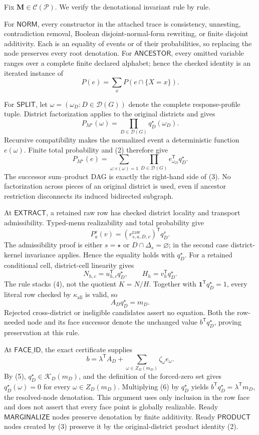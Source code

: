 Fix \(\mathbf M\in\mathcal C(\mathcal P)\).  We verify the denotational invariant rule by rule.

For \(\mathsf{NORM}\), every constructor in the attached trace is consistency, unnesting, contradiction removal, Boolean disjoint-normal-form rewriting, or finite disjoint additivity.  Each is an equality of events or of their probabilities, so replacing the node preserves every root denotation.  For \(\mathsf{ANCESTOR}\), every omitted variable ranges over a complete finite declared alphabet; hence the checked identity is an iterated instance of
\[
P(e)=\sum_xP(e\cap\{X=x\}).
\tag{1}
\]

For \(\mathsf{SPLIT}\), let \(\omega=(\omega_D:D\in\mathcal D(G))\) denote the complete response-profile tuple.  District factorization applies to the original districts and gives
\[
P_{M^\star}(\omega)=
\prod_{D\in\mathcal D(G)}q_D^\star(\omega_D).
\tag{2}
\]
Recursive compatibility makes the normalized event a deterministic function \(e(\omega)\).  Finite total probability and (2) therefore give
\[
P_{M^\star}(e)
=\sum_{\omega:e(\omega)=1}
\prod_{D\in\mathcal D(G)}e_{\omega_D}^{\mathsf T}q_D^\star.
\tag{3}
\]
The successor sum--product DAG is exactly the right-hand side of (3).  No factorization across pieces of an original district is used, even if ancestor restriction disconnects its induced bidirected subgraph.

At \(\mathsf{EXTRACT}\), a retained raw row has checked district locality and transport admissibility.  Typed-menu realizability and total probability give
\[
P_a^s(v)=(r^{\mathrm{raw}}_{s,a,D,v})^{\mathsf T}q_D^s.
\]
The admissibility proof is either \(s=\star\) or \(D\cap\Delta_s=\varnothing\); in the second case district-kernel invariance applies.  Hence the equality holds with \(q_D^\star\).  For a retained conditional cell, district-cell linearity gives
\[
N_{h,c}=u_{h,c}^{\mathsf T}q_D^\star,
\qquad
H_h=v_h^{\mathsf T}q_D^\star.
\tag{4}
\]
The rule stacks (4), not the quotient \(K=N/H\).  Together with \(\mathbf 1^{\mathsf T}q_D^\star=1\), every literal row checked by \(\kappa_{\mathrm{all}}\) is valid, so
\[
A_Dq_D^\star=m_D.
\tag{5}
\]
Rejected cross-district or ineligible candidates assert no equation.  Both the row-needed node and its face successor denote the unchanged value \(b^{\mathsf T}q_D^\star\), proving preservation at this rule.

At \(\mathsf{FACE\_ID}\), the exact certificate supplies
\[
b=\lambda^{\mathsf T}A_D+
\sum_{\omega\in Z_D(m_D)}\zeta_\omega e_\omega.
\tag{6}
\]
By (5), \(q_D^\star\in\mathcal K_D(m_D)\), and the definition of the forced-zero set gives \(q_D^\star(\omega)=0\) for every \(\omega\in Z_D(m_D)\).  Multiplying (6) by \(q_D^\star\) yields \(b^{\mathsf T}q_D^\star=\lambda^{\mathsf T}m_D\), the resolved-node denotation.  This argument uses only inclusion in the row face and does not assert that every face point is globally realizable.  Ready \(\mathsf{MARGINALIZE}\) nodes preserve denotation by finite additivity.  Ready \(\mathsf{PRODUCT}\) nodes created by (3) preserve it by the original-district product identity (2).

